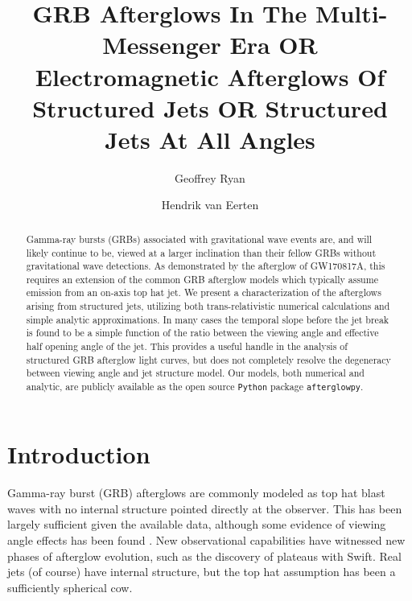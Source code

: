 \documentclass[twocolumn]{aastex62}
\newcommand{\gwbns}{GW170817A}
\newcommand{\afterglowpy}{{\tt afterglowpy}}
\newcommand{\python}{{\tt Python}}
\begin{document}
\title{GRB Afterglows In The Multi-Messenger Era  OR  Electromagnetic Afterglows Of Structured Jets  OR  Structured Jets At All Angles}

\author[0000-0001-9068-7157]{Geoffrey Ryan}

\author{Hendrik van Eerten}




\begin{abstract}
	Gamma-ray bursts (GRBs) associated with gravitational wave events are, and will likely continue to be, viewed at a larger inclination than their fellow GRBs without gravitational wave detections.  As demonstrated by the afterglow of \gwbns{}, this requires an extension of the common GRB afterglow models which typically assume emission from an on-axis top hat jet.  We present a characterization of the afterglows arising from structured jets, utilizing both trans-relativistic numerical calculations and simple analytic approximations.  In many cases the temporal slope before the jet break is found to be a simple function of the ratio between the viewing angle and effective half opening angle of the jet.  This provides a useful handle in the analysis of structured GRB afterglow light curves, but does not completely resolve the degeneracy between viewing angle and jet structure model.  Our models, both numerical and analytic, are publicly available as the open source \python{} package \afterglowpy{}.
	
\end{abstract}

\section{Introduction}

Gamma-ray burst (GRB) afterglows are commonly modeled as top hat blast waves with no internal structure pointed directly at the observer. This has been largely sufficient given the available data, although some evidence of viewing angle effects has been found \citep{Ryan:2015aa}.  New observational capabilities have witnessed new phases of afterglow evolution, such as the discovery of plateaus with Swift.  Real jets (of course) have internal structure, but the top hat assumption has been a sufficiently spherical cow. 
\end{document}
